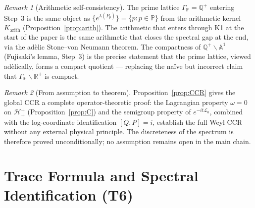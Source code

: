 \documentclass[12pt,a4paper]{article}
\theoremstyle{remark}
\newtheorem*{remark}{Remark}
\begin{document}
\begin{remark}[Arithmetic self-consistency]
The prime lattice $\Gamma_\mathbb{P}=\mathbb{Q}^+$ entering Step~3
is the same object as $\{e^{\lambda(P_p)}\}=\{p:p\in\mathbb{P}\}$
from the arithmetic kernel $K_{\mathrm{arith}}$ (Proposition~\ref{prop:arith}).
The arithmetic that enters through K1 at the start of the paper
is the same arithmetic that closes the spectral gap at the end,
via the adèlic Stone--von Neumann theorem.
The compactness of $\mathbb{Q}^+\backslash\mathbb{A}^1$
(Fujisaki's lemma, Step~3) is the precise statement that the prime
lattice, viewed adèlically, forms a compact quotient — replacing
the na\"ive but incorrect claim that
$\Gamma_\mathbb{P}\backslash\mathbb{R}^+$ is compact.
\end{remark}

\begin{remark}[From assumption to theorem]
Proposition~\ref{prop:CCR} gives the global CCR a complete
operator-theoretic proof: the Lagrangian property $\omega=0$ on
$\mathcal{H}^+_+$ (Proposition~\ref{prop:C}) and the semigroup
property of $e^{-it\mathcal{L}_0}$, combined with the log-coordinate
identification $[Q,P]=i$, establish the full Weyl CCR without any
external physical principle.
The discreteness of the spectrum is therefore proved unconditionally;
no assumption remains open in the main chain.
\end{remark}

\section{Trace Formula and Spectral Identification (T6)}
\label{sec:trace}
\end{document}
